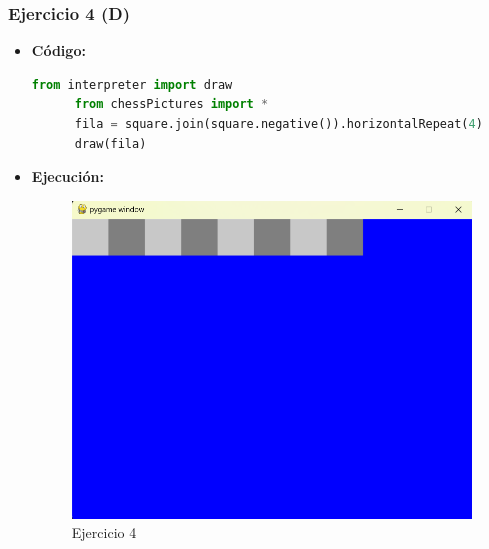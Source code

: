 \documentclass{article}
\begin{document}
  \subsubsection{Ejercicio 4 (D)}
  \begin{itemize}
    \item \textbf{Código:}
    \begin{lstlisting}[language=Python, caption=Ejercicio2d]
      from interpreter import draw
      from chessPictures import *
      fila = square.join(square.negative()).horizontalRepeat(4)
      draw(fila)
    \end{lstlisting}
    \item \textbf{Ejecución:}  
    \begin{figure}[H]
      \centering
      \includegraphics[width=1\textwidth, keepaspectratio]{img/ejercicio2d.png}
      \caption{Ejercicio 4}
    \end{figure}
  \end{itemize}
  \newpage

\end{document}

